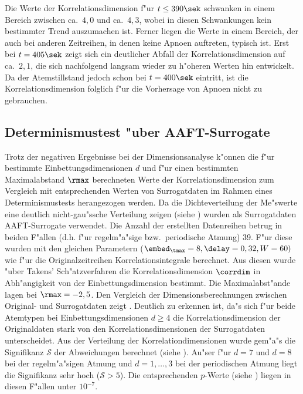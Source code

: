 Die Werte der Korrelationsdimension f"ur $t\leq390\sek$ schwanken in einem Bereich
zwischen ca.\ $4,0$ und ca.\ $4,3$, wobei in diesen Schwankungen kein bestimmter Trend auszumachen ist.
Ferner liegen die Werte in einem Bereich, der auch bei anderen Zeitreihen, in denen
keine Apnoen auftreten, typisch ist. Erst bei $t=405\sek$ zeigt sich ein deutlicher Abfall
der Korrelationsdimension auf ca.\ $2,1$, die sich nachfolgend langsam wieder zu h"oheren
Werten hin entwickelt.  Da der Atemstillstand jedoch schon bei $t=400\sek$ eintritt, ist
die Korrelationsdimension folglich f"ur die Vorhersage von Apnoen nicht zu gebrauchen.


\subsection{Determinismustest "uber AAFT-Surrogate}

Trotz der negativen Ergebnisse bei der Dimensionsanalyse k"onnen die f"ur bestimmte
Einbettungsdimensionen $d$ und f"ur einen bestimmten Maximalabstand $\rmax$ berechneten Werte der
Korrelationsdimension zum Vergleich mit entsprechenden Werten von Surrogatdaten im Rahmen
eines Determinismustests herangezogen werden. Da die Dichteverteilung der Me"swerte eine
deutlich nicht-gau"ssche Verteilung zeigen (siehe ) wurden als Surrogatdaten
AAFT-Surrogate verwendet. Die Anzahl der erstellten Datenreihen betrug in beiden F"allen
(d.h. f"ur regelm"a"sige bzw.\ periodische Atmung) 39. F"ur diese wurden mit den gleichen
Parametern ($\embed_\tmax=8, \delay=0,32, W=60)$ wie f"ur die Originalzeitreihen
Korrelationsintegrale berechnet. Aus diesen wurde "uber Takens' Sch"atzverfahren die
Korrelationsdimension $\corrdim$ in Abh"angigkeit von der Einbettungsdimension bestimmt. Die
Maximalabst"ande lagen bei $\rmax=-2,5$. Den Vergleich der Dimensionsberechnungen zwischen
Original- und Surrogatdaten zeigt . Deutlich zu erkennen ist, da"s sich 
f"ur beide Atemtypen bei Einbettungsdimensionen $d\geq4$ die Korrelationsdimension der
Originaldaten stark von den Korrelationsdimensionen der Surrogatdaten unterscheidet.
Aus der Verteilung der Korrelationdimensionen wurde gem"a"s  die
Signifikanz $\mathcal S$ der Abweichungen berechnet (siehe ).
Au"ser f"ur $d=7$ und $d=8$ bei der regelm"a"sigen Atmung und $d=1,\dots,3$ bei der
periodischen Atmung liegt die Signifikanz sehr hoch ($\mathcal{S}>5$). 
Die entsprechenden $p$-Werte (siehe ) liegen in diesen F"allen unter
$10^{-7}$. 

